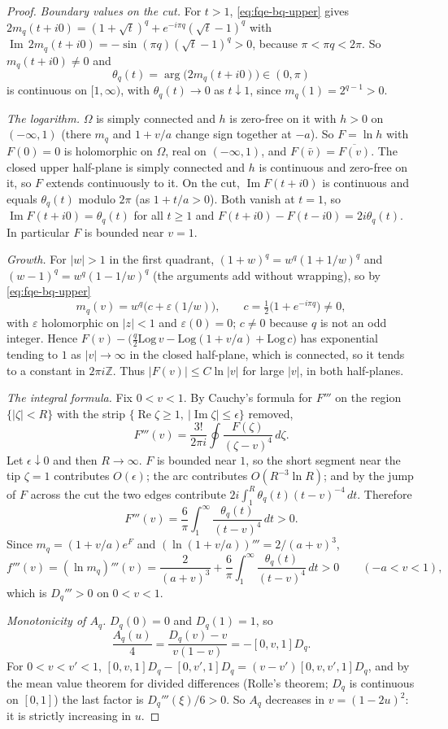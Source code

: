 \begin{proof}
\emph{Boundary values on the cut.} For $t>1$, \eqref{eq:fqe-bq-upper} gives
$2m_q(t+i0)=(1+\sqrt t)^q+e^{-i\pi q}(\sqrt t-1)^q$ with
$\operatorname{Im}\,2m_q(t+i0)=-\sin(\pi q)(\sqrt t-1)^q>0$, because $\pi<\pi q<2\pi$.
So $m_q(t+i0)\ne0$ and
\[
 \theta_q(t)=\arg\bigl(2m_q(t+i0)\bigr)\in(0,\pi)
\]
is continuous on $[1,\infty)$, with $\theta_q(t)\to0$ as $t\downarrow1$, since $m_q(1)=2^{q-1}>0$.

\emph{The logarithm.} $\Omega$ is simply connected and $h$ is zero-free on it with $h>0$ on $(-\infty,1)$
(there $m_q$ and $1+v/a$ change sign together at $-a$). So $F=\ln h$ with $F(0)=0$ is holomorphic on $\Omega$,
real on $(-\infty,1)$, and $F(\bar v)=\overline{F(v)}$. The closed upper half-plane is simply connected and $h$
is continuous and zero-free on it, so $F$ extends continuously to it. On the cut, $\operatorname{Im}F(t+i0)$ is
continuous and equals $\theta_q(t)$ modulo $2\pi$ (as $1+t/a>0$). Both vanish at $t=1$, so
$\operatorname{Im}F(t+i0)=\theta_q(t)$ for all $t\ge1$ and $F(t+i0)-F(t-i0)=2i\theta_q(t)$.
In particular $F$ is bounded near $v=1$.

\emph{Growth.} For $|w|>1$ in the first quadrant, $(1+w)^q=w^q(1+1/w)^q$ and $(w-1)^q=w^q(1-1/w)^q$ (the
arguments add without wrapping), so by \eqref{eq:fqe-bq-upper}
\[
 m_q(v)=w^q\bigl(c+\varepsilon(1/w)\bigr),\qquad c=\tfrac12\bigl(1+e^{-i\pi q}\bigr)\ne0,
\]
with $\varepsilon$ holomorphic on $|z|<1$ and $\varepsilon(0)=0$; $c\ne0$ because $q$ is not an odd integer.
Hence $F(v)-\bigl(\tfrac q2\mathrm{Log}\,v-\mathrm{Log}(1+v/a)+\mathrm{Log}\,c\bigr)$ has exponential tending to
$1$ as $|v|\to\infty$ in the closed half-plane, which is connected, so it tends to a constant in $2\pi i\mathbb Z$.
Thus $|F(v)|\le C\ln|v|$ for large $|v|$, in both half-planes.

\emph{The integral formula.} Fix $0<v<1$. By Cauchy's formula for $F'''$ on the region
$\{|\zeta|<R\}$ with the strip $\{\operatorname{Re}\zeta\ge1,\ |\operatorname{Im}\zeta|\le\epsilon\}$ removed,
\[
 F'''(v)=\frac{3!}{2\pi i}\oint\frac{F(\zeta)}{(\zeta-v)^4}\,d\zeta .
\]
Let $\epsilon\downarrow0$ and then $R\to\infty$. $F$ is bounded near $1$, so the short segment near the
tip $\zeta=1$ contributes $O(\epsilon)$; the arc contributes $O(R^{-3}\ln R)$; and by the jump of $F$ across the cut
the two edges contribute $2i\int_1^R\theta_q(t)(t-v)^{-4}\,dt$. Therefore
\[
 F'''(v)=\frac6\pi\int_1^\infty\frac{\theta_q(t)}{(t-v)^4}\,dt>0 .
\]
Since $m_q=(1+v/a)e^F$ and $(\ln(1+v/a))'''=2/(a+v)^3$,
\[
 f'''(v)=(\ln m_q)'''(v)=\frac2{(a+v)^3}+\frac6\pi\int_1^\infty\frac{\theta_q(t)}{(t-v)^4}\,dt>0
 \qquad(-a<v<1),
\]
which is $D_q'''>0$ on $0<v<1$.

\emph{Monotonicity of $A_q$.} $D_q(0)=0$ and $D_q(1)=1$, so
\[
 \frac{A_q(u)}4=\frac{D_q(v)-v}{v(1-v)}=-[0,v,1]D_q .
\]
For $0<v<v'<1$, $[0,v,1]D_q-[0,v',1]D_q=(v-v')[0,v,v',1]D_q$, and by the mean value theorem for
divided differences (Rolle's theorem; $D_q$ is continuous on $[0,1]$) the last factor is
$D_q'''(\xi)/6>0$. So $A_q$ decreases in $v=(1-2u)^2$: it is strictly increasing in $u$.
\end{proof}
